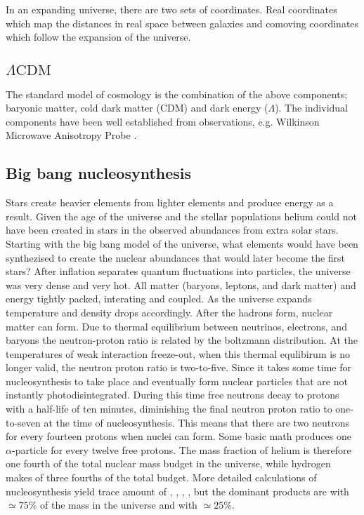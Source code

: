 In an expanding universe, there are two sets of coordinates. Real coordinates which map the distances in real space between galaxies and comoving coordinates which follow the expansion of the universe.

\subsection{$\Lambda\mathrm{CDM}$} 
The standard model of cosmology is the combination of the above components; baryonic matter, cold dark matter (CDM) and dark energy ($\Lambda$). The individual components have been well established from observations, e.g. Wilkinson Microwave Anisotropy Probe .

\subsection{Big bang nucleosynthesis} \label{sec:bbn}
Stars create heavier elements from lighter elements and produce energy as a result. Given the age of the universe and the stellar populations helium could not have been created in stars in the observed abundances from extra solar stars.
Starting with the big bang model of the universe, what elements would have been synthezised to create the nuclear abundances that would later become the first stars?
After inflation separates quantum fluctuations into particles, the universe was very dense and very hot. All matter (baryons, leptons, and dark matter) and energy tightly packed, interating and coupled. As the universe expands temperature and density drops accordingly.
After the hadrons form, nuclear matter can form.
Due to thermal equilibrium between neutrinos, electrons, and baryons the neutron-proton ratio is related by the boltzmann distribution. At the temperatures of weak interaction freeze-out, when this thermal equlibirum is no longer valid, the neutron proton ratio is two-to-five.
Since it takes some time for nucleosynthesis to take place and eventually form nuclear particles that are not instantly photodisintegrated.
During this time free neutrons decay to protons with a half-life of ten minutes, diminishing the final neutron proton ratio to one-to-seven at the time of nucleosynthesis. This means that there are two neutrons for every fourteen protons when nuclei can form.
Some basic math produces one $\alpha$-particle for every twelve free protons. The mass fraction of helium is therefore one fourth of the total nuclear mass budget in the universe, while hydrogen makes of three fourths of the total budget.
More detailed calculations of nucleosynthesis yield trace amount of , , , , but the dominant products are  with $\simeq75\%$ of the mass in the universe and  with $\simeq25\%$.

\FloatBarrier
